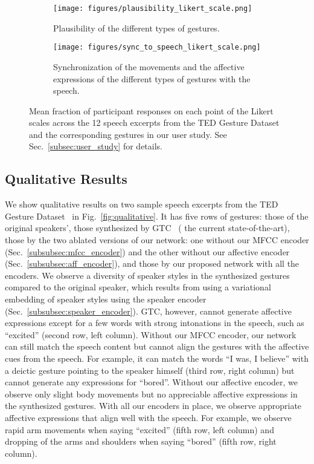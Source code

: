 \documentclass[conference,compsoc]{IEEEtran}
\theoremstyle{definition}
\newcommand{\sota}{state-of-the-art}
\begin{document}
\begin{figure}[t]
    \centering
    \begin{subfigure}[b]{\columnwidth}
        \centering
        \texttt{[image: figures/plausibility\_likert\_scale.png]}
        \caption{Plausibility of the different types of gestures.}
        \label{fig:plausibility_likert_scale}
    \end{subfigure}
\begin{subfigure}[b]{\columnwidth}
        \centering
        \texttt{[image: figures/sync\_to\_speech\_likert\_scale.png]}
        \caption{Synchronization of the movements and the affective expressions of the different types of gestures with the speech.}
        \label{fig:sync_to_speech_likert_scale}
        \vspace{-7pt}
    \end{subfigure}
    \caption{Mean fraction of participant responses on each point of the Likert scales across the 12 speech excerpts from the TED Gesture Dataset~\cite{cospeech_gestures} and the corresponding gestures in our user study. See Sec.~\ref{subsec:user_study} for details.}
    \label{fig:user_study}
    \vspace{-10pt}
\end{figure}

\subsection{Qualitative Results}\label{subsec:qualitative}
We show qualitative results on two sample speech excerpts from the TED Gesture Dataset~\cite{cospeech_gestures} in Fig.~\ref{fig:qualitative}. It has five rows of gestures: those of the original speakers', those synthesized by GTC~\cite{trimodal} ( the current \sota), those by the two ablated versions of our network: one without our MFCC encoder (Sec.~\ref{subsubsec:mfcc_encoder}) and the other without our affective encoder (Sec.~\ref{subsubsec:aff_encoder}), and those by our proposed network with all the encoders. We observe a diversity of speaker styles in the synthesized gestures compared to the original speaker, which results from using a variational embedding of speaker styles using the speaker encoder (Sec.~\ref{subsubsec:speaker_encoder}). GTC, however, cannot generate affective expressions except for a few words with strong intonations in the speech, such as ``excited'' (second row, left column). Without our MFCC encoder, our network can still match the speech content but cannot align the gestures with the affective cues from the speech. For example, it can match the words ``I was, I believe'' with a deictic gesture pointing to the speaker himself (third row, right column) but cannot generate any expressions for ``bored''. Without our affective encoder, we observe only slight body movements but no appreciable affective expressions in the synthesized gestures. With all our encoders in place, we observe appropriate affective expressions that align well with the speech. For example, we observe rapid arm movements when saying ``excited'' (fifth row, left column) and dropping of the arms and shoulders when saying ``bored'' (fifth row, right column).
\end{document}
